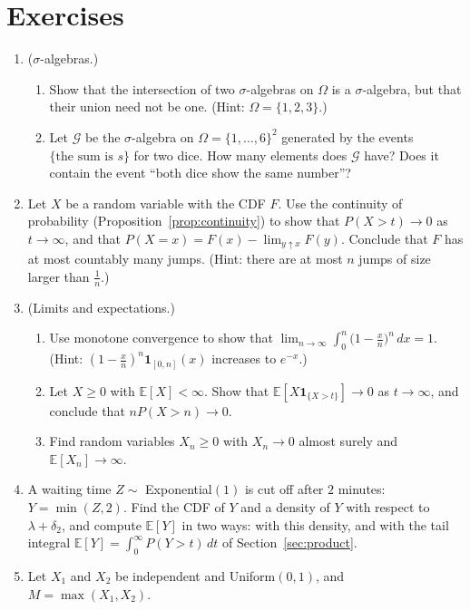\documentclass[11pt]{article}
\newcommand{\E}{\mathbb{E}}
\theoremstyle{definition}
\theoremstyle{plain}
\theoremstyle{remark}
\begin{document}
\section*{Exercises}
\begin{enumerate}[leftmargin=*]
    \item ($\sigma$-algebras.)
    \begin{enumerate}[label=(\alph*)]
        \item Show that the intersection of two $\sigma$-algebras on $\Omega$ is a $\sigma$-algebra, but that their union need not be one. (Hint: $\Omega = \{1, 2, 3\}$.)
        \item Let $\mathcal{G}$ be the $\sigma$-algebra on $\Omega = \{1, \ldots, 6\}^2$ generated by the events $\{\text{the sum is } s\}$ for two dice. How many elements does $\mathcal{G}$ have? Does it contain the event ``both dice show the same number''?
    \end{enumerate}
    \item Let $X$ be a random variable with the CDF $F$. Use the continuity of probability (Proposition~\ref{prop:continuity}) to show that $P(X > t) \to 0$ as $t \to \infty$, and that $P(X = x) = F(x) - \lim_{y \uparrow x} F(y)$. Conclude that $F$ has at most countably many jumps. (Hint: there are at most $n$ jumps of size larger than $\frac{1}{n}$.)
    \item (Limits and expectations.)
    \begin{enumerate}[label=(\alph*)]
        \item Use monotone convergence to show that $\lim_{n \to \infty}\int_0^n \big(1 - \frac{x}{n}\big)^n\, dx = 1$. (Hint: $(1 - \frac{x}{n})^n\mathbf{1}_{[0, n]}(x)$ increases to $e^{-x}$.)
        \item Let $X \geq 0$ with $\E[X] < \infty$. Show that $\E[X\mathbf{1}_{\{X > t\}}] \to 0$ as $t \to \infty$, and conclude that $nP(X > n) \to 0$.
        \item Find random variables $X_n \geq 0$ with $X_n \to 0$ almost surely and $\E[X_n] \to \infty$.
    \end{enumerate}
    \item A waiting time $Z \sim$ Exponential$(1)$ is cut off after $2$ minutes: $Y = \min(Z, 2)$. Find the CDF of $Y$ and a density of $Y$ with respect to $\lambda + \delta_2$, and compute $\E[Y]$ in two ways: with this density, and with the tail integral $\E[Y] = \int_0^\infty P(Y > t)\, dt$ of Section~\ref{sec:product}.
    \item Let $X_1$ and $X_2$ be independent and Uniform$(0, 1)$, and $M = \max(X_1, X_2)$.

\end{enumerate}
\end{document}
